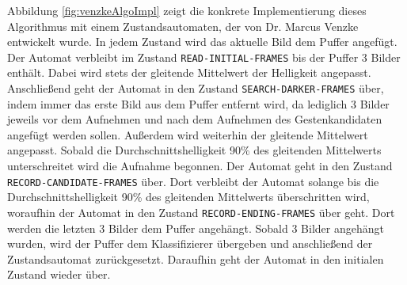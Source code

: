 \newline
\newline
Abbildung \ref{fig:venzkeAlgoImpl} zeigt die konkrete Implementierung dieses Algorithmus mit einem Zustandsautomaten, der von Dr. Marcus Venzke entwickelt wurde. In jedem Zustand wird das aktuelle Bild dem Puffer angefügt.
Der Automat verbleibt im Zustand \texttt{READ-INITIAL-FRAMES} bis der Puffer 3 Bilder enthält. Dabei wird stets der gleitende Mittelwert der Helligkeit angepasst. Anschließend geht der Automat in den Zustand
\texttt{SEARCH-DARKER-FRAMES} über, indem immer das erste Bild aus dem Puffer entfernt wird, da lediglich 3 Bilder jeweils vor dem Aufnehmen und nach dem Aufnehmen des
Gestenkandidaten angefügt werden sollen. Außerdem wird weiterhin der gleitende Mittelwert angepasst. Sobald die Durchschnittshelligkeit 90\% des gleitenden Mittelwerts unterschreitet wird die Aufnahme begonnen.
Der Automat geht in den Zustand \texttt{RECORD-CANDIDATE-FRAMES} über. Dort verbleibt der Automat solange bis die Durchschnittshelligkeit 90\% des gleitenden Mittelwerts überschritten wird, woraufhin der Automat
in den Zustand \texttt{RECORD-ENDING-FRAMES} über geht. Dort werden die letzten 3 Bilder dem Puffer angehängt. Sobald 3 Bilder angehängt wurden, wird der Puffer dem Klassifizierer übergeben und anschließend
der Zustandsautomat zurückgesetzt. Daraufhin geht der Automat in den initialen Zustand wieder über.